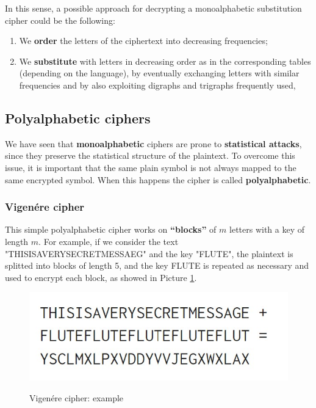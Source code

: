 In this sense, a possible approach for decrypting a monoalphabetic substitution cipher could be the following:

\begin{enumerate}
    \item We \textbf{order} the letters of the ciphertext into decreasing frequencies;
    \item We \textbf{substitute} with letters in decreasing order as in the corresponding tables (depending on the language), by eventually exchanging letters with similar frequencies and by also exploiting digraphs and trigraphs frequently used,
\end{enumerate}

\subsection{Polyalphabetic ciphers}
We have seen that \textbf{monoalphabetic} ciphers are prone to \textbf{statistical attacks}, since they preserve the statistical structure of the plaintext. To overcome this issue, it is important that the same plain symbol is not always mapped to the same encrypted symbol. When this happens the cipher is called \textbf{polyalphabetic}.

\subsubsection{Vigenére cipher}
This simple polyalphabetic cipher works on \textbf{“blocks”} of $m$ letters with a key of length $m$. For example, if we consider the text "THISISAVERYSECRETMESSAEG" and the key "FLUTE", the plaintext is splitted into blocks of length 5, and the key FLUTE is repeated as necessary and used to encrypt each block, as showed in Picture \ref{poly1}.

\begin{figure}[h!]
        \centering
        \includegraphics[scale = 1.2]{img/poly1.jpg}
        \label{poly1}
        \caption{Vigenére cipher: example}
\end{figure}


